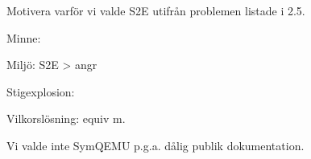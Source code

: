 Motivera varför vi valde S2E utifrån problemen listade i 2.5.

Minne:

Miljö: S2E > angr

Stigexplosion:

Vilkorslösning: equiv m.

Vi valde inte SymQEMU p.g.a. dålig publik dokumentation.
